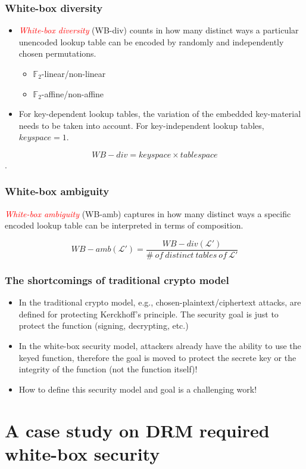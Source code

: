 \documentclass{beamer}
\begin{document}
\frame
{
\frametitle{White-box diversity}
\begin{itemize}
\item \textcolor{red}{\textsl{White-box diversity}} (WB-div) counts in how many distinct ways a particular unencoded lookup table can be encoded by randomly and independently chosen permutations.

\begin{itemize}
\item $\mathbb{F}_{2}$-linear/non-linear
\item $\mathbb{F}_{2}$-affine/non-affine
\end{itemize}

\item For key-dependent lookup tables, the variation of the embedded key-material needs to be taken into account. For key-independent lookup tables, $keyspace=1$.
\end{itemize}

\[WB-div = keyspace \times tablespace\].

}

\frame
{
\frametitle{White-box ambiguity}
\textcolor{red}{\textsl{White-box ambiguity}} (WB-amb) captures in how many distinct ways a specific encoded lookup table can be interpreted in terms of composition.

\[ WB-amb(\mathcal{L'}) = \frac{WB-div(\mathcal{L'})}{\# \ of \ distinct \  tables \ of \ \mathcal{L'}}\]
}

\frame
{
\frametitle{The shortcomings of traditional crypto model}
\begin{itemize}
 \setlength{\itemsep}{12pt}

 \item In the traditional crypto model, e.g., chosen-plaintext/ciphertext attacks, are defined for protecting Kerckhoff's principle. The security goal is just to
 protect the function (signing, decrypting, etc.)

 \item In the white-box security model, attackers already have the ability to use the keyed function, therefore the goal is moved to protect the secrete key or the integrity of the function (not the function itself)!

 \item How to define this security model and goal is a challenging work!

\end{itemize}

}

\section{A case study on DRM required white-box security}
\end{document}
